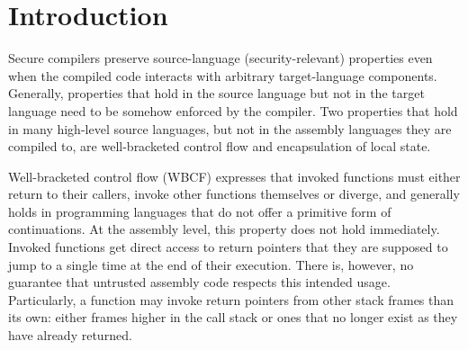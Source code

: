 \documentclass[acmsmall,review,anonymous]{acmart}\settopmatter{printfolios=true,printccs=false,printacmref=false}
\begin{document}




\maketitle


\section{Introduction}
\label{sec:introduction}
Secure compilers preserve source-language (security-relevant) properties even when the compiled code interacts with arbitrary target-language components.
Generally, properties that hold in the source language but not in the target language need to be somehow enforced by the compiler.
Two properties that hold in many high-level source languages, but not in the assembly languages they are compiled to, are well-bracketed control flow and encapsulation of local state.

Well-bracketed control flow (WBCF) expresses that invoked functions must either return to their callers, invoke other functions themselves or diverge, and generally holds in programming languages that do not offer a primitive form of continuations. 
At the assembly level, this property does not hold immediately. 
Invoked functions get direct access to return pointers that they are supposed to jump to a single time at the end of their execution.
There is, however, no guarantee that untrusted assembly code respects this intended usage.
Particularly, a function may invoke return pointers from other stack frames than its own: either frames higher in the call stack or ones that no longer exist as they have already returned. 
\end{document}
